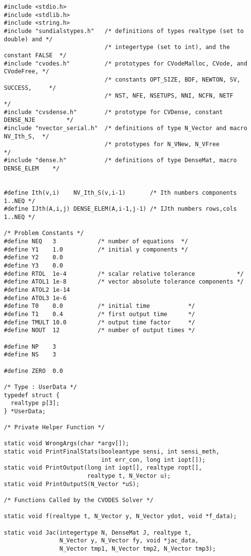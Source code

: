 \begin{verbatim}
#include <stdio.h>
#include <stdlib.h>
#include <string.h>
#include "sundialstypes.h"   /* definitions of types realtype (set to double) and */
                             /* integertype (set to int), and the constant FALSE  */
#include "cvodes.h"          /* prototypes for CVodeMalloc, CVode, and CVodeFree, */
                             /* constants OPT_SIZE, BDF, NEWTON, SV, SUCCESS,     */
                             /* NST, NFE, NSETUPS, NNI, NCFN, NETF                */
#include "cvsdense.h"        /* prototype for CVDense, constant DENSE_NJE         */
#include "nvector_serial.h"  /* definitions of type N_Vector and macro NV_Ith_S,  */
                             /* prototypes for N_VNew, N_VFree                    */
#include "dense.h"           /* definitions of type DenseMat, macro DENSE_ELEM    */


#define Ith(v,i)    NV_Ith_S(v,i-1)       /* Ith numbers components 1..NEQ */
#define IJth(A,i,j) DENSE_ELEM(A,i-1,j-1) /* IJth numbers rows,cols 1..NEQ */

/* Problem Constants */
#define NEQ   3            /* number of equations  */
#define Y1    1.0          /* initial y components */
#define Y2    0.0
#define Y3    0.0
#define RTOL  1e-4         /* scalar relative tolerance            */
#define ATOL1 1e-8         /* vector absolute tolerance components */
#define ATOL2 1e-14
#define ATOL3 1e-6
#define T0    0.0          /* initial time           */
#define T1    0.4          /* first output time      */
#define TMULT 10.0         /* output time factor     */
#define NOUT  12           /* number of output times */

#define NP    3
#define NS    3

#define ZERO  0.0

/* Type : UserData */
typedef struct {
  realtype p[3];
} *UserData;

/* Private Helper Function */

static void WrongArgs(char *argv[]);
static void PrintFinalStats(booleantype sensi, int sensi_meth, 
                            int err_con, long int iopt[]);
static void PrintOutput(long int iopt[], realtype ropt[], 
                        realtype t, N_Vector u);
static void PrintOutputS(N_Vector *uS);

/* Functions Called by the CVODES Solver */

static void f(realtype t, N_Vector y, N_Vector ydot, void *f_data);

static void Jac(integertype N, DenseMat J, realtype t,
                N_Vector y, N_Vector fy, void *jac_data, 
                N_Vector tmp1, N_Vector tmp2, N_Vector tmp3);


\end{verbatim}
